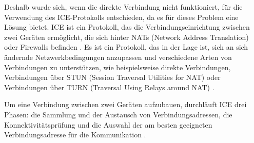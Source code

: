\noindent Deshalb wurde sich, wenn die direkte Verbindung nicht funktioniert, für die Verwendung des ICE-Protokolls entschieden, da es für dieses Problem eine Lösung bietet.
ICE ist ein Protokoll, das die Verbindungseinrichtung zwischen zwei Geräten ermöglicht, die sich hinter NATs (Network Address Translation) oder Firewalls befinden \parencite[S. 6 ff.]{rfc8445_ICE}. Es ist ein Protokoll, das in der Lage ist, sich an sich ändernde Netzwerkbedingungen anzupassen und verschiedene Arten von Verbindungen zu unterstützen, wie beispielsweise direkte Verbindungen, Verbindungen über STUN (Session Traversal Utilities for NAT) oder Verbindungen über TURN (Traversal Using Relays around NAT) \parencite[S. 1]{rfc8445_ICE}. 

Um eine Verbindung zwischen zwei Geräten aufzubauen, durchläuft ICE drei Phasen: die Sammlung und der Austausch von Verbindungsadressen, die Konnektivitätsprüfung und die Auswahl der am besten geeigneten Verbindungsadresse für die Kommunikation \parencite[S. 7 ff.]{rfc8445_ICE}.

